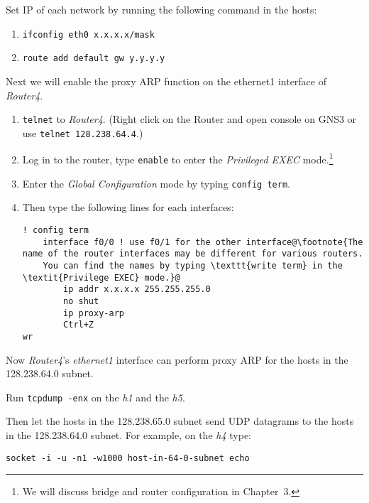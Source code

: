 \documentclass{../UTNetLab}
\begin{document}
    Set IP of each network by running the following command in the hosts:
    \begin{enumerate}
        \item \lstinline[emph={x,eth0},morekeywords={[3]masks}]{ifconfig eth0 x.x.x.x/mask}
        \item \lstinline[emph={y},morekeywords={[3]add,default,gw}]{route add default gw y.y.y.y}
    \end{enumerate}
    Next we will enable the proxy ARP function on the ethernet1 interface of \textit{Router4}.
    \begin{enumerate}
        \item \lstinline{telnet} to \textit{Router4}.
                (Right click on the Router and open console on GNS3 or use \lstinline{telnet 128.238.64.4}.)
        \item Log in to the router, type \lstinline[language={cisco}]{enable} to enter the \textit{Privileged EXEC} mode.\footnote{We will discuss bridge and router configuration in Chapter~3.}
        \item Enter the \textit{Global Configuration} mode by typing \lstinline[language={cisco}]{config term}.
        \item Then type the following lines for each interfaces:
        \begin{lstlisting}[language={cisco}, escapechar={@}, emph={x}]
! config term
    interface f0/0 ! use f0/1 for the other interface@\footnote{The name of the router interfaces may be different for various routers.
    You can find the names by typing \texttt{write term} in the \textit{Privilege EXEC} mode.}@
        ip addr x.x.x.x 255.255.255.0
        no shut
        ip proxy-arp
        Ctrl+Z
wr
        \end{lstlisting}
    \end{enumerate}
    
    Now \textit{Router4}’s \textit{ethernet1} interface can perform proxy ARP for the hosts in the 128.238.64.0 subnet.

    Run \lstinline{tcpdump -enx} on the \textit{h1} and the \textit{h5}.

    Then let the hosts in the 128.238.65.0 subnet send UDP datagrams to the hosts in the 128.238.64.0 subnet.
    For example, on the \textit{h4} type:
    \begin{lstlisting}[emph={host-in-64-0-subnet},morekeywords={[3]echo}]
socket -i -u -n1 -w1000 host-in-64-0-subnet echo
    \end{lstlisting}
\end{document}

